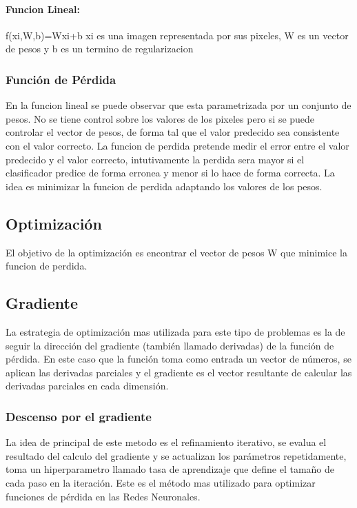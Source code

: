 \documentclass[a4paper,11pt,spanish]{book}
\begin{document}
	\paragraph{Funcion Lineal:} 
	  f(xi,W,b)=Wxi+b
	  xi es una imagen representada por sus pixeles, W es un vector de pesos y b es un termino de regularizacion

      \subsubsection{Función de Pérdida}
	En la funcion lineal se puede observar que esta parametrizada por un conjunto de pesos.
	No se tiene control sobre los valores de los pixeles pero si se puede controlar el vector de pesos, de forma tal que el valor predecido sea consistente con el valor correcto. 
	La funcion de perdida pretende medir el error entre el valor predecido y el valor correcto, intutivamente la perdida sera mayor si el clasificador predice de forma erronea y 
	menor si lo hace de forma correcta.
	La idea es minimizar la funcion de perdida adaptando los valores de los pesos.

    \subsection{Optimización}
      El objetivo de la optimización es encontrar el vector de pesos W que minimice la funcion de perdida.

    \subsection{Gradiente} 
      La estrategia de optimización mas utilizada para este tipo de problemas es la de seguir la dirección del gradiente (también llamado derivadas) de la función de pérdida.
      En este caso que la función toma como entrada un vector de números, se aplican las derivadas parciales y el gradiente es el vector resultante de calcular las derivadas parciales
      en cada dimensión.

      \subsubsection{Descenso por el gradiente}
	La idea de principal de este metodo es el refinamiento iterativo, se evalua el resultado del calculo del gradiente y se actualizan los parámetros repetidamente, 
	toma un hiperparametro llamado tasa de aprendizaje que define el tamaño de cada paso en la iteración.
	Este es el método mas utilizado para optimizar funciones de pérdida en las Redes Neuronales. 
\end{document}
